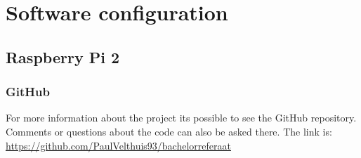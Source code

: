 \documentclass{sig-alternate-br}
\begin{document}
\section{Software configuration}\label{sec:software}

\subsection{Raspberry Pi 2}

\subsubsection{GitHub}
For more information about the project its possible to see the GitHub repository. Comments or questions about the code can also be asked there. \newline
The link is: \newline
\url{https://github.com/PaulVelthuis93/bachelorreferaat}
\end{document}
